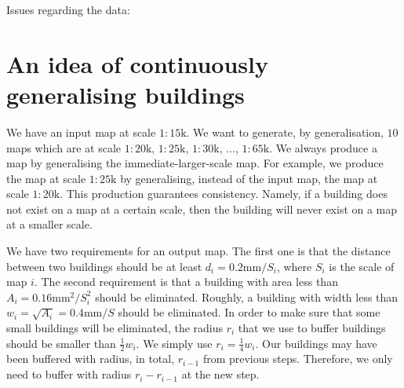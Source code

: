 \documentclass[graybox]{svmult}
\begin{document}
Issues regarding the data:

%

\clearpage

\section{An idea of continuously generalising buildings}
We have an input map at scale $1:15 \mathrm{k}$.
We want to generate, by generalisation, $10$ maps which are at 
scale $1:20\mathrm{k}$, $1:25\mathrm{k}$, 
$1:30\mathrm{k}$, $\dots$, $1:65\mathrm{k}$.
We always produce a map by generalising the 
immediate-larger-scale map. For example, we produce the map at 
scale $1:25\mathrm{k}$ by generalising, instead of the input 
map, the map at scale $1:20\mathrm{k}$.
This production 
guarantees consistency. Namely, if a building does not exist on 
a map at a certain scale, then the building will never exist on 
a map at a smaller scale.

We have two requirements for an output map.
The first one is that the distance between two 
buildings should be at least $d_i=0.2 \mathrm{mm}/S_i$, where 
$S_i$ is the scale of map $i$.
The second requirement is that a building with area less than 
$A_i=0.16\mathrm{mm}^2/S^2_i$ should be eliminated. Roughly, a 
building with width less than 
$w_i=\sqrt{A_i}=0.4\mathrm{mm}/S$ should be eliminated.
In order to make sure that some small buildings will be 
eliminated, the radius $r_i$ that we use to buffer buildings 
should be smaller than $\frac{1}{2}w_i$. We simply use 
$r_i=\frac{1}{4}w_i$.
Our buildings may have been buffered with radius, in total, 
$r_{i-1}$ from previous steps.
Therefore, we only need to buffer with radius $r_i-r_{i-1}$ at 
the new 
step.
\end{document}
